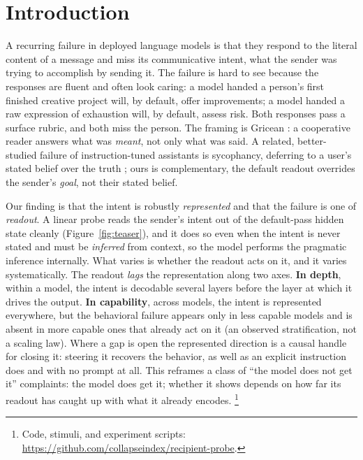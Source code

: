 \documentclass[11pt]{article}
\begin{document}
\section{Introduction}
A recurring failure in deployed language models is that they respond to the literal content of a message and
miss its communicative intent, what the sender was trying to accomplish by sending it. The failure is hard to
see because the responses are fluent and often look caring: a model handed a person's first finished creative
project will, by default, offer improvements; a model handed a raw expression of exhaustion will, by default,
assess risk. Both responses pass a surface rubric, and both miss the person. The framing is Gricean \citep{grice1975logic}: a cooperative reader answers what
was \emph{meant}, not only what was said. A related, better-studied failure of instruction-tuned assistants
\citep{ouyang2022instructgpt} is sycophancy, deferring to a user's stated belief over the truth
\citep{sharma2023sycophancy}; ours is complementary, the default readout overrides the sender's \emph{goal},
not their stated belief.

Our finding is that the intent is robustly \emph{represented} and that the failure is one of \emph{readout}. A
linear probe reads the sender's intent out of the default-pass hidden state cleanly (Figure~\ref{fig:teaser}),
and it does so even when the intent is never stated and must be \emph{inferred} from context, so the model
performs the pragmatic inference internally. What varies is whether the readout acts on it, and it varies
systematically. The readout \emph{lags} the representation along two axes. \textbf{In depth}, within a model,
the intent is decodable several layers before the layer at which it drives the output. \textbf{In capability},
across models, the intent is represented everywhere, but the behavioral failure appears only in less capable
models and is absent in more capable ones that already act on it (an observed stratification, not a scaling
law). Where a gap is open the represented direction is a causal handle for closing it: steering it recovers the
behavior, as well as an explicit instruction does and with no prompt at all. This reframes a class of ``the model does not get it'' complaints: the model does get it;
whether it shows depends on how far its readout has caught up with what it already encodes.%
\footnote{Code, stimuli, and experiment scripts: \url{https://github.com/collapseindex/recipient-probe}.}
\end{document}
